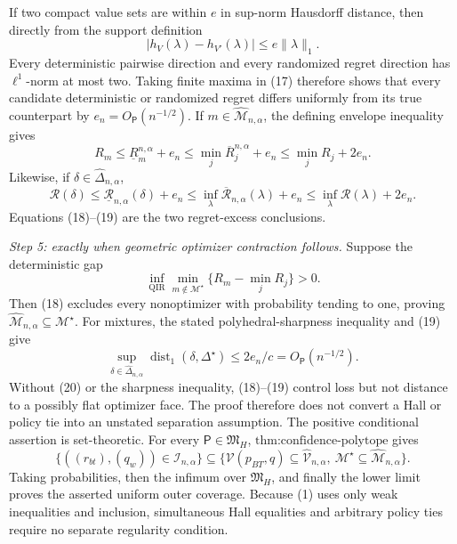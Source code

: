 If two compact value sets are within \(e\) in sup-norm Hausdorff distance, then directly from the support definition
\[
 |h_V(\lambda)-h_{V'}(\lambda)|
 \le e\lVert\lambda\rVert_1.                             \tag{17}
\]
Every deterministic pairwise direction and every randomized regret direction has \(\ell^1\)-norm at most two.  Taking finite maxima in (17) therefore shows that every candidate deterministic or randomized regret differs uniformly from its true counterpart by
\(e_n=O_{\mathsf P}(n^{-1/2})\).  If
\(m\in\widehat{\mathcal M}_{n,\alpha}\), the defining envelope inequality gives
\[
 R_m\le\underline R_m^{n,\alpha}+e_n
 \le\min_j\overline R_j^{n,\alpha}+e_n
 \le\min_jR_j+2e_n.                                     \tag{18}
\]
Likewise, if \(\delta\in\widehat\Delta_{n,\alpha}\),
\[
 \mathcal R(\delta)
 \le\underline{\mathcal R}_{n,\alpha}(\delta)+e_n
 \le\inf_\lambda\overline{\mathcal R}_{n,\alpha}(\lambda)+e_n
 \le\inf_\lambda\mathcal R(\lambda)+2e_n.               \tag{19}
\]
Equations (18)--(19) are the two regret-excess conclusions.

\emph{Step 5: exactly when geometric optimizer contraction follows.}
Suppose the deterministic gap
\[
 \inf_{\operatorname{QIR}}
 \min_{m\notin\mathcal M^\star}
 \{R_m-\min_jR_j\}>0.                                   \tag{20}
\]
Then (18) excludes every nonoptimizer with probability tending to one, proving
\(\widehat{\mathcal M}_{n,\alpha}\subseteq\mathcal M^\star\).  For mixtures, the stated polyhedral-sharpness inequality and (19) give
\[
 \sup_{\delta\in\widehat\Delta_{n,\alpha}}
 \operatorname{dist}_1(\delta,\Delta^\star)
 \le 2e_n/c=O_{\mathsf P}(n^{-1/2}).                      \tag{21}
\]
Without (20) or the sharpness inequality, (18)--(19) control loss but not distance to a possibly flat optimizer face.  The proof therefore does not convert a Hall or policy tie into an unstated separation assumption.
The positive conditional assertion is set-theoretic.  For every \(\mathsf P\in\mathfrak M_H\), \(\text{thm:confidence-polytope}\) gives
\[
 \{((r_{bt}),(q_w))\in\mathcal I_{n,\alpha}\}
 \subseteq
 \{\mathcal V(p_{BT},q)\subseteq\widehat{\mathcal V}_{n,\alpha},\ 
   \mathcal M^\star\subseteq\widehat{\mathcal M}_{n,\alpha}\}.       \tag{1}
\]
Taking probabilities, then the infimum over \(\mathfrak M_H\), and finally the lower limit proves the asserted uniform outer coverage.  Because (1) uses only weak inequalities and inclusion, simultaneous Hall equalities and arbitrary policy ties require no separate regularity condition.


